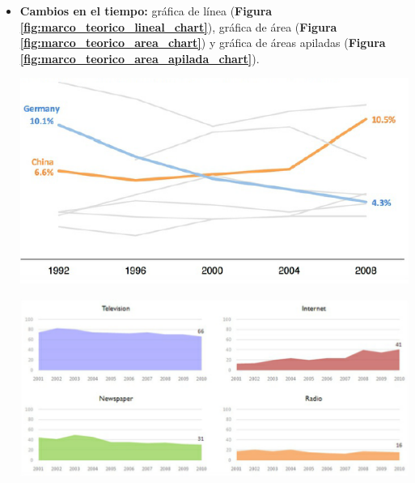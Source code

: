 \begin{itemize}
    \item\textbf{Cambios en el tiempo:} gráfica de línea (\textbf{Figura \ref{fig:marco_teorico_lineal_chart}}), gráfica de área (\textbf{Figura \ref{fig:marco_teorico_area_chart}}) y gráfica de áreas apiladas (\textbf{Figura \ref{fig:marco_teorico_area_apilada_chart}}).
    \begin{center}
        \bigbreak
        \includegraphics[scale=0.5]{images/marco_teorico/lineal_chart.png}
        \label{fig:marco_teorico_lineal_chart}
        \bigbreak
        
        \includegraphics[scale=0.3]{images/marco_teorico/area_chart.png}
        \label{fig:marco_teorico_area_chart}
        \bigbreak


\end{center}
\end{itemize}
